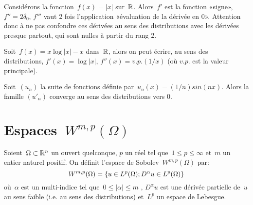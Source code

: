 \begin{remarque}
Considérons la fonction~$f(x) =|x|$ sur~$\mathbb R$. Alors~$f'$ est la fonction «signe», $f'' = 2\delta_0$, $f'''$ vaut 2 fois l'application «évaluation de la dérivée en 0». Attention donc à ne pas confondre ces dérivées au sens des distributions avec les dérivées presque partout, qui sont nulles à partir du rang 2.

\medskip
Soit~$f(x)=x\log|x|-x$ dans~$\mathbb R$, alors on peut écrire, au sens des distributions, $f'(x) = \log|x|$, $f''(x) = v.p.(1/x)$ (où $v.p.$ est la valeur principale).

\medskip
Soit~$(u_n)$ la suite de fonctions définie par~$u_n(x) = (1/n)sin(nx)$. Alors la famille $(u'_n)$ converge au sens des distributions vers 0.
\end{remarque}


\medskip
\section{Espaces~$W^{m,p}(\Omega)$}

\begin{definition}
Soient~$\Omega \subset \mathbb R^n$ un ouvert quelconque, $p$ un réel tel que~$1\leqslant p\leqslant \infty$ et~$m$ un entier naturel positif.
On définit l'espace de Sobolev~$W^{m,p}(\Omega)$ par:
\begin{equation}\label{Eq-SoboW}\colorred
W^{m, p}(\Omega)=\{u\in L^p(\Omega); D^\alpha u \in L^p(\Omega)\}
\end{equation}
où~$\alpha$ est un multi-indice tel que~$0\leqslant |\alpha| \leqslant m$ , $D^\alpha u$ est une dérivée partielle de~$u$ au sens faible (i.e. au sens des distributions) et~$L^p$ un espace de Lebesgue.
\end{definition}

